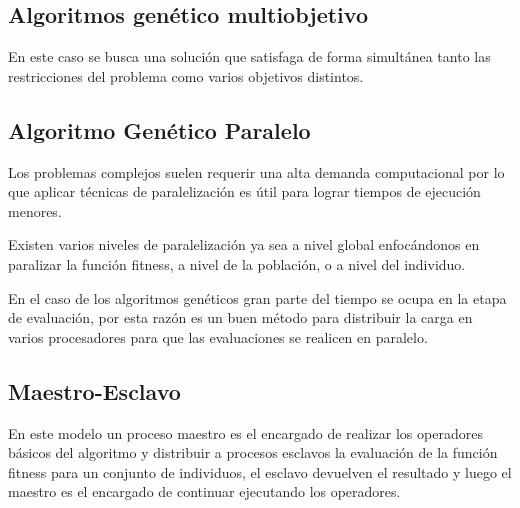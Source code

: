 %
%


\subsection{Algoritmos genético multiobjetivo}

En este caso se busca una solución que satisfaga de forma simultánea tanto las restricciones del problema como varios objetivos distintos.



\subsection{Algoritmo Genético Paralelo}
Los problemas complejos suelen requerir una alta demanda computacional por lo que aplicar técnicas de paralelización es útil para lograr tiempos de ejecución menores.

Existen varios niveles de paralelización ya sea a nivel global enfocándonos en paralizar la función fitness, a nivel de la población, o a nivel del individuo. \citep{Nesmachnow2002}

En el caso de los algoritmos genéticos gran parte del tiempo se ocupa en la etapa de evaluación, por esta razón es un buen método para distribuir la carga en varios procesadores para que las evaluaciones se realicen en paralelo.


\subsection{Maestro-Esclavo}

En este modelo un proceso maestro es el encargado de realizar los operadores básicos del algoritmo y distribuir a procesos esclavos la evaluación de la función fitness para un conjunto de individuos, el esclavo devuelven el resultado y luego el maestro es el encargado de continuar ejecutando los operadores.

